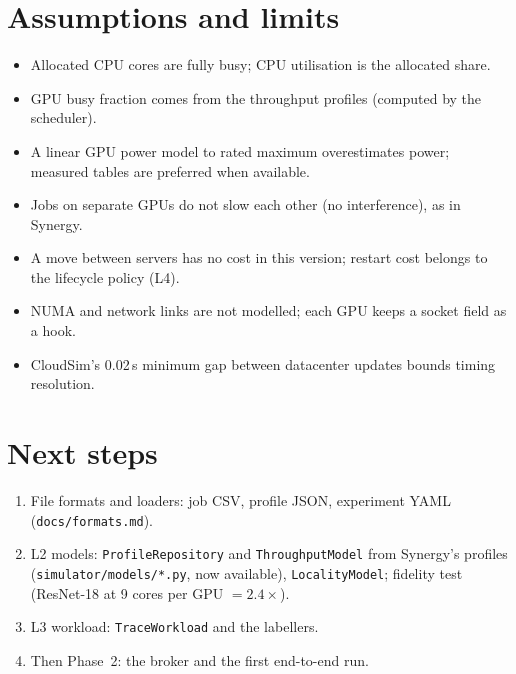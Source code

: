 \documentclass[11pt,a4paper]{article}
\newcommand{\code}[1]{\texttt{#1}}
\begin{document}
\section{Assumptions and limits}
\begin{itemize}
  \item Allocated CPU cores are fully busy; CPU utilisation is the allocated share.
  \item GPU busy fraction comes from the throughput profiles (computed by the scheduler).
  \item A linear GPU power model to rated maximum overestimates power; measured tables are preferred
        when available.
  \item Jobs on separate GPUs do not slow each other (no interference), as in Synergy.
  \item A move between servers has no cost in this version; restart cost belongs to the lifecycle
        policy (L4).
  \item NUMA and network links are not modelled; each GPU keeps a socket field as a hook.
  \item CloudSim's 0.02\,s minimum gap between datacenter updates bounds timing resolution.
\end{itemize}

\section{Next steps}
\begin{enumerate}
  \item File formats and loaders: job CSV, profile JSON, experiment YAML (\code{docs/formats.md}).
  \item L2 models: \code{ProfileRepository} and \code{ThroughputModel} from Synergy's profiles
        (\code{simulator/models/*.py}, now available), \code{LocalityModel}; fidelity test
        (ResNet-18 at 9 cores per GPU $= 2.4\times$).
  \item L3 workload: \code{TraceWorkload} and the labellers.
  \item Then Phase~2: the broker and the first end-to-end run.
\end{enumerate}
\end{document}
